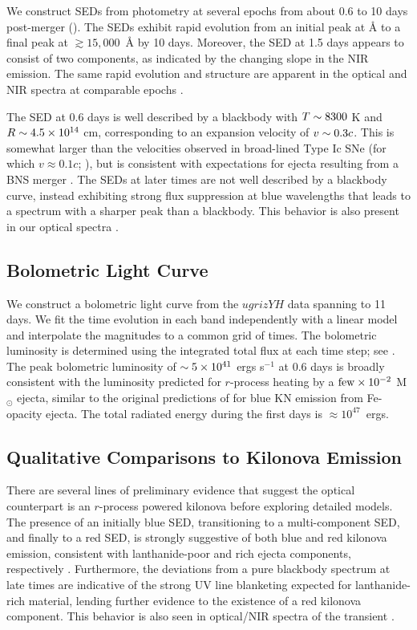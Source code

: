 We construct SEDs from photometry at several epochs from about 0.6 to 10 days post-merger (). The SEDs exhibit rapid evolution from an initial peak at  $\mbox{\AA}$ to a final peak at $\gtrsim 15,000$~$\mbox{\AA}$ by 10 days.  Moreover, the SED at 1.5 days appears to consist of two components, as indicated by the changing slope in the NIR emission. The same rapid evolution and structure are apparent in the optical and NIR spectra at comparable epochs \citep{Chornock+17,Nicholl+17a}.

The SED at 0.6 days is well described by a blackbody with $T\sim 8300$ K and $R\sim 4.5\times 10^{14}$ cm, corresponding to an expansion velocity of $v\sim 0.3c$. This is somewhat larger than the velocities observed in broad-lined Type Ic SNe (for which $v\approx 0.1c$; \citealt{Modjaz+16}), but is consistent with expectations for ejecta resulting from a BNS merger \citep{Metzger2017}. The SEDs at later times are not well described by a blackbody curve, instead exhibiting strong flux suppression at blue wavelengths that leads to a spectrum with a sharper peak than a blackbody.  This behavior is also present in our optical spectra \citep{Nicholl+17a}.

\subsection{Bolometric Light Curve}
\label{sec:ch5_lc_bol}

We construct a bolometric light curve from the $ugrizYH$ data spanning to 11 days. We fit the time evolution in each band independently with a linear model and interpolate the magnitudes to a common grid of times. The bolometric luminosity is determined using the integrated total flux at each time step; see . The peak bolometric luminosity of $\sim5\times10^{41}$ ergs s$^{-1}$ at 0.6 days is broadly consistent with the luminosity predicted for $r$-process heating by a ${\rm few}\times 10^{-2}$ M$_{\odot}$ ejecta, similar to the original predictions of \cite{Metzger+10} for blue KN emission from Fe-opacity ejecta. The total radiated energy during the first  days is $\approx10^{47}$~ergs.

\subsection{Qualitative Comparisons to Kilonova Emission}
\label{sec:ch5_kn_compare}
There are several lines of preliminary evidence that suggest the optical counterpart is an $r$-process powered kilonova before exploring detailed models. The presence of an initially blue SED, transitioning to a multi-component SED, and finally to a red SED, is strongly suggestive of both blue and red kilonova emission, consistent with  lanthanide-poor and rich ejecta components, respectively \citep{Metzger+10,BarnesKasen13,Tanaka+14,MetzgerFernandez14,Kasen+15,Wollaeger+17}. Furthermore, the deviations from a pure blackbody spectrum at late times are indicative of the strong UV line blanketing expected for lanthanide-rich material, lending further evidence to the existence of a red kilonova component. This behavior is also seen in optical/NIR spectra of the transient \citep{Chornock+17,Nicholl+17a}.

